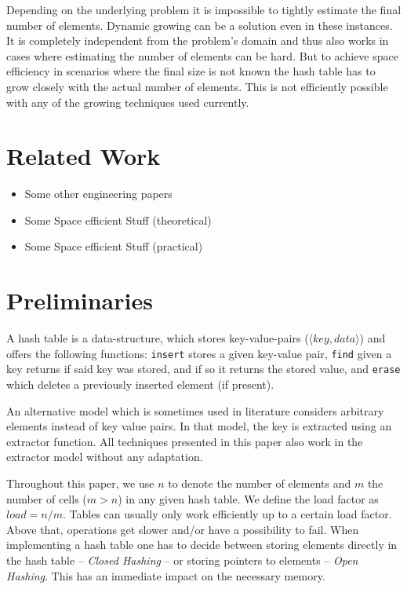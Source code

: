 \documentclass[a4paper,UKenglish]{lipics-v2016}
\begin{document}
Depending on the underlying problem it is impossible to tightly
estimate the final number of elements.  Dynamic growing can be a
solution even in these instances.  It is completely independent from
the problem's domain and thus also works in cases where estimating the
number of elements can be hard.  But to achieve space efficiency in
scenarios where the final size is not known the hash table has to grow
closely with the actual number of elements.  This is not efficiently
possible with any of the growing techniques used currently.

\section{Related Work}
\begin{itemize}
\item Some other engineering papers

\item Some Space efficient Stuff  (theoretical)

\item Some Space efficient Stuff  (practical)
\end{itemize}

\section{Preliminaries}
A hash table is a data-structure, which stores key-value-pairs
(\(\langle key, data \rangle\)) and offers the following functions:
\verb~insert~ stores a given key-value pair, \verb~find~ given a key returns if
said key was stored, and if so it returns the stored value, and
\verb~erase~ which deletes a previously inserted element (if present).

An alternative model which is sometimes used in literature considers
arbitrary elements instead of key value pairs.  In that model, the key
is extracted using an extractor function.  All techniques presented in
this paper also work in the extractor model without any adaptation.

Throughout this paper, we use $n$ to denote the number of elements and
$m$ the number of cells ($m > n$) in any given hash table.  We define
the load factor as $load = n/m$.  Tables can usually only work
efficiently up to a certain load factor.  Above that, operations get
slower and/or have a possibility to fail.
When implementing a hash table one has to decide between storing
elements directly in the hash table -- \emph{Closed Hashing} -- or storing
pointers to elements -- \emph{Open Hashing}. This has an immediate impact
on the necessary memory.
\end{document}
